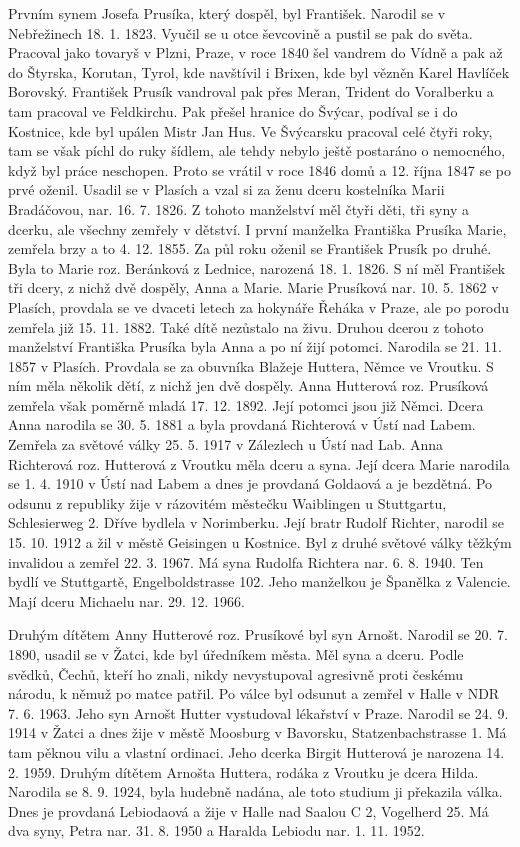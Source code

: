 \documentclass[../dejiny-rodu-prusiku.tex]{subfiles}
\begin{document}
Prvním synem Josefa Prusíka, který dospěl, byl František. Narodil se v Nebřežinech 18. 1. 1823. Vyučil se u otce ševcovině a pustil se pak do světa. Pracoval jako to­varyš v Plzni, Praze, v roce 1840 šel vandrem do Vídně a pak až do Štyrska, Korutan, Tyrol, kde navštívil i Brixen, kde byl vězněn Karel Havlíček Borovský. František Prusík vandroval pak přes Meran, Trident do Voralberku a tam pracoval ve Feldkirchu. Pak přešel hra­nice do Švýcar, podíval se i do Kostnice, kde byl upálen Mistr Jan Hus. Ve Švýcarsku pracoval celé čtyři roky, tam se však píchl do ruky šídlem, ale tehdy nebylo ještě postaráno o nemocného, když byl práce neschopen. Proto se vrátil v roce 1846 domů a 12. října 1847 se po prvé oženil. Usadil se v Plasích a vzal si za ženu dceru kostelníka Marii Bradáčovou, nar. 16. 7. 1826. Z tohoto manžel­ství měl čtyři děti, tři syny a dcerku, ale všechny zemře­ly v dětství. I první manželka Františka Prusíka Marie, zemřela brzy a to 4. 12. 1855. Za půl roku oženil se Fran­tišek Prusík po druhé. Byla to Marie roz. Beránková z Lednice, narozená 18. 1. 1826. S ní měl František tři dcery, z nichž dvě dospěly, Anna a Marie. Marie Prusíková nar. 10. 5. 1862 v Plasích, provdala se ve dvaceti letech za hokynáře Řeháka v Praze, ale po porodu zemřela již 15. 11. 1882. Také dítě nezůstalo na živu. Druhou dcerou z tohoto
manželství Františka Prusíka byla Anna a po ní žijí potomci. Narodila se 21. 11. 1857 v Plasích. Provdala se za obuvníka Blažeje Huttera, Němce ve Vroutku. S ním měla několik dětí, z nichž jen dvě dospěly. Anna Hutterová roz. Prusíková zemřela však poměrně mladá 17. 12. 1892. Její potomci jsou již Němci. Dcera Anna narodila se 30. 5. 1881 a byla provdaná Richterová v Ústí nad Labem. Zemřela za světové války 25. 5. 1917 v Zálezlech u Ústí nad Lab. Anna Richterová roz. Hutterová z Vroutku měla dceru a syna. Její dcera Marie narodila se 1. 4. 1910 v Ústí nad Labem a dnes je provdaná Goldaová a je bezdětná. Po odsunu z republiky žije v rá­zovitém městečku Waiblingen u Stuttgartu, Schlesierweg 2. Dříve bydlela v Norimberku. Její bratr Rudolf Richter, narodil se 15. 10. 1912 a žil v městě Geisingen u Kostnice. Byl z druhé světové války těžkým invalidou a zemřel 22. 3. 1967. Má syna Rudolfa Richtera nar. 6. 8. 1940. Ten bydlí ve Stuttgartě, Engelboldstrasse 102. Jeho manžel­kou je Španělka z Valencie. Mají dceru Michaelu nar. 29. 12. 1966.

Druhým dítětem Anny Hutterové roz. Prusíkové byl syn Arnošt. Narodil se 20. 7. 1890, usadil se v Žatci, kde byl úředníkem města. Měl syna a dceru. Podle svědků, Čechů, kteří ho znali, nikdy nevystupoval agresivně proti českému národu, k němuž po matce patřil. Po válce byl odsunut a zemřel v Halle v NDR 7. 6. 1963. Jeho syn Arnošt Hutter vystudoval lékařství v Praze. Narodil se 24. 9. 1914 v Žatci a dnes žije v městě Moosburg v Bavorsku, Statzenbachstrasse 1. Má tam pěknou vilu a vlastní ordi­naci. Jeho dcerka Birgit Hutterová je narozena 14. 2. 1959. Druhým dítětem Arnošta Huttera, rodáka z Vroutku je dce­ra Hilda. Narodila se 8. 9. 1924, byla hudebně nadána, ale toto studium ji překazila válka. Dnes je provdaná Lebiodaová a žije v Halle nad Saalou C 2, Vogelherd 25. Má dva syny, Petra nar. 31. 8. 1950 a Haralda Lebiodu nar. 1. 11. 1952.
\end{document}
